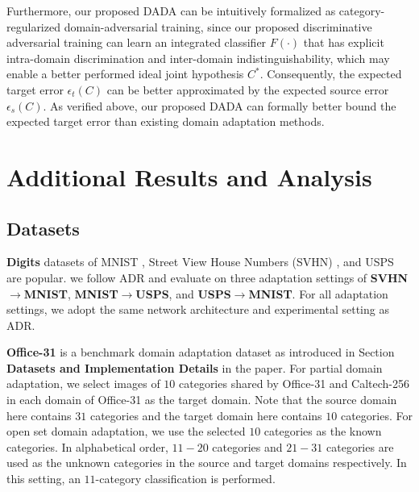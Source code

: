 \documentclass[letterpaper]{article} \usepackage{aaai20}  \usepackage{times}  \usepackage{helvet} \usepackage{courier}  \usepackage[hyphens]{url}  \usepackage{graphicx} \urlstyle{rm} \def\UrlFont{\rm}  \usepackage{graphicx}  \frenchspacing  \setlength{\pdfpagewidth}{8.5in}  \setlength{\pdfpageheight}{11in}
\begin{document}
Furthermore, our proposed DADA can be intuitively formalized as category-regularized domain-adversarial training, since our proposed discriminative adversarial training can learn an integrated classifier $F(\cdot)$ that has explicit intra-domain discrimination and inter-domain indistinguishability, which may enable a better performed ideal joint hypothesis $C^*$. Consequently, the expected target error $\epsilon_t(C)$ can be better approximated by the expected source error $\epsilon_s(C)$. As verified above, our proposed DADA can formally better bound the expected target error than existing domain adaptation methods.

\section{Additional Results and Analysis}
\label{sec4}
\subsection{Datasets}
\noindent\textbf{Digits} datasets of MNIST \cite{mnist}, Street View House Numbers (SVHN) \cite{svhn}, and USPS \cite{usps} are popular. we follow ADR \cite{adr} and evaluate on three adaptation settings of \textbf{SVHN}$\rightarrow$\textbf{MNIST}, \textbf{MNIST}$\rightarrow$\textbf{USPS}, and \textbf{USPS}$\rightarrow$\textbf{MNIST}. For all adaptation settings, we adopt the same network architecture and experimental setting as ADR.

\noindent\textbf{Office-31} \cite{office31} is a benchmark domain adaptation dataset as introduced in Section \textbf{Datasets and Implementation Details} in the paper. For partial domain adaptation, we select images of $10$ categories shared by Office-31 and Caltech-256 \cite{caltech256} in each domain of Office-31 as the target domain. Note that the source domain here contains $31$ categories and the target domain here contains $10$ categories. For open set domain adaptation, we use the selected $10$ categories as the known categories. In alphabetical order, $11-20$ categories and $21-31$ categories are used as the unknown categories in the source and target domains respectively. In this setting, an $11$-category classification is performed. 
\end{document}
